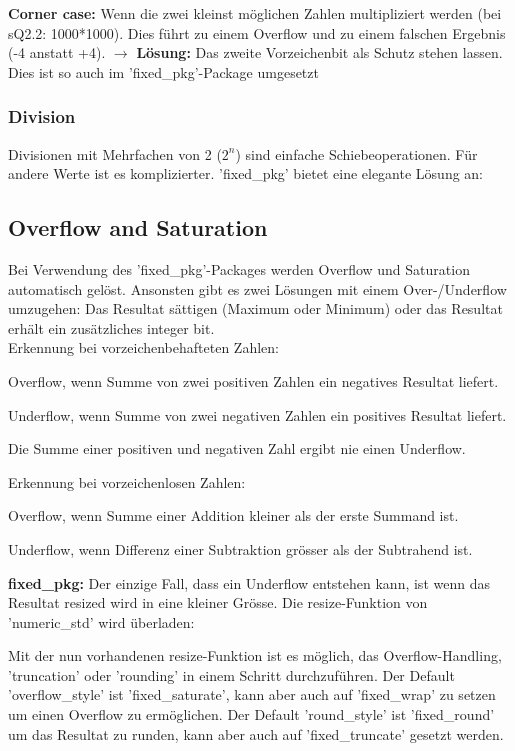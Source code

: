
\textbf{Corner case:} Wenn die zwei kleinst möglichen Zahlen multipliziert werden (bei sQ2.2: 1000*1000). Dies führt zu einem Overflow und zu einem falschen Ergebnis (-4 anstatt +4). $\rightarrow$ \textbf{Lösung:} Das zweite Vorzeichenbit als Schutz stehen lassen. Dies ist so auch im 'fixed\_pkg'-Package umgesetzt

\subsubsection{Division}
Divisionen mit Mehrfachen von 2 ($2^n$) sind einfache Schiebeoperationen. Für andere Werte ist es komplizierter. 'fixed\_pkg' bietet eine elegante Lösung an:


\subsection{Overflow and Saturation}$~$ \\
Bei Verwendung des 'fixed\_pkg'-Packages werden Overflow und Saturation automatisch gelöst. Ansonsten gibt es zwei Lösungen mit einem Over-/Underflow umzugehen: Das Resultat sättigen (Maximum oder Minimum) oder das Resultat erhält ein zusätzliches integer bit.\\
Erkennung bei vorzeichenbehafteten Zahlen:
\begin{compactitem}
  \item Overflow, wenn Summe von zwei positiven Zahlen ein negatives Resultat liefert.
  \item Underflow, wenn Summe von zwei negativen Zahlen ein positives Resultat liefert.
  \item Die Summe einer positiven und negativen Zahl ergibt nie einen Underflow.
\end{compactitem}
Erkennung bei vorzeichenlosen Zahlen:
\begin{compactitem}
  \item Overflow, wenn Summe einer Addition kleiner als der erste Summand ist.
  \item Underflow, wenn Differenz einer Subtraktion grösser als der Subtrahend ist.
\end{compactitem}
\textbf{fixed\_pkg:} Der einzige Fall, dass ein Underflow entstehen kann, ist wenn das Resultat resized wird in eine kleiner Grösse. Die resize-Funktion von 'numeric\_std' wird überladen:

Mit der nun vorhandenen resize-Funktion ist es möglich, das Overflow-Handling, 'truncation' oder 'rounding' in einem Schritt durchzuführen. Der Default 'overflow\_style' ist 'fixed\_saturate', kann aber auch auf 'fixed\_wrap' zu setzen um einen Overflow zu ermöglichen. Der Default 'round\_style' ist 'fixed\_round' um das Resultat zu runden, kann aber auch auf 'fixed\_truncate' gesetzt werden.

